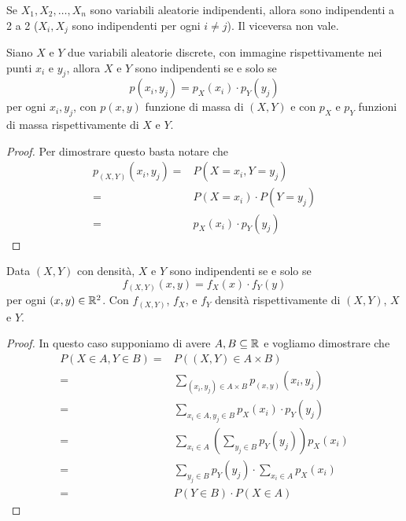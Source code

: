 \begin{observation}
	Se $X_1, X_2, \dots, X_n$ sono variabili aleatorie indipendenti, allora sono indipendenti a 2
	a 2 ($X_i, X_j$ sono indipendenti per ogni $i \neq j$). Il viceversa non vale.
\end{observation}

\begin{proposition}
	Siano $X$ e $Y$ due variabili aleatorie discrete, con immagine rispettivamente nei punti $x_i$
	e $y_j$, allora $X$ e $Y$ sono indipendenti se e solo se
	\[ p(x_i, y_j) = p_X (x_i) \cdot p_Y (y_j) \]
	per ogni $x_i, y_j$, con $p(x,y)$ funzione di massa di $(X, Y)$ e con $p_X$ e $p_Y$ funzioni di
	massa rispettivamente di $X$ e $Y$.
	\begin{proof}
		Per dimostrare questo basta notare che
		\begin{align*}
			p_{(X,Y)} (x_i, y_j) = & P(X = x_i, Y = y_j)         \\
			=                      & P(X = x_i) \cdot P(Y = y_j) \\
			=                      & p_X (x_i) \cdot p_Y (y_j)
		\end{align*}
	\end{proof}

	Data $(X, Y)$ con densità, $X$ e $Y$ sono indipendenti se e solo se
	\[ f_{(X,Y)} (x,y) = f_X (x) \cdot f_Y (y) \]
	per ogni $(x, y) \in \mathbb{R}^2$. Con $f_{(X,Y)}$, $f_X$, e $f_Y$ densità rispettivamente di
	$(X,Y)$, $X$ e $Y$.
	\begin{proof}
		In questo caso supponiamo di avere $A, B \subseteq \mathbb{R}$ e vogliamo dimostrare che
		\begin{align*}
			P(X \in A, Y \in B) = & P((X,Y) \in A \times B)                                    \\
			=                     & \sum_{(x_i, y_j) \in A \times B} p_{(x,y)} (x_i, y_j)      \\
			=                     & \sum_{x_i \in A, y_j \in B} p_X(x_i) \cdot p_Y(y_j)        \\
			=                     & \sum_{x_i \in A} \left( \sum_{y_j \in B} p_Y(y_j) \right)
			p_X(x_i)                                                                           \\
			=                     & \sum_{y_j \in B} p_Y(y_j) \cdot \sum_{x_i \in A} p_X (x_i) \\
			=                     & P(Y \in B) \cdot P(X \in A)
		\end{align*}
	\end{proof}
\end{proposition}

